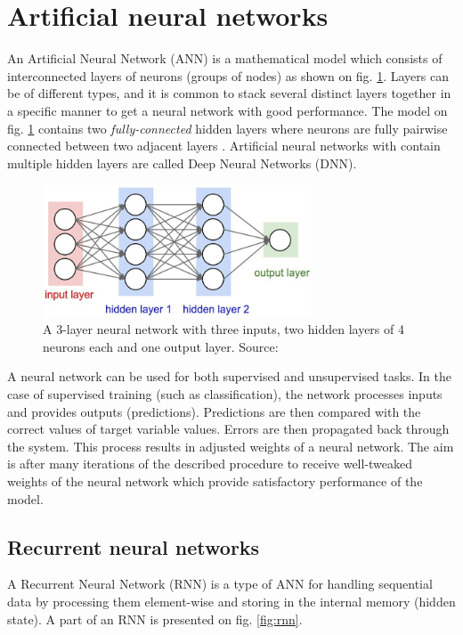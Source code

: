 \section{Artificial neural networks}
An Artificial Neural Network (ANN) is a mathematical model which consists of interconnected layers of neurons (groups of nodes) as shown on fig. \ref{fig:neural-net}. Layers can be of different types, and it is common to stack several distinct layers together in a specific manner to get a neural network with good performance. The model on fig. \ref{fig:neural-net} contains two \textit{fully-connected} hidden layers where neurons are fully pairwise connected between two adjacent layers \citep{FeiFei-2016}. Artificial neural networks with contain multiple hidden layers are called Deep Neural Networks (DNN). 

\begin{figure}[h]
    \centering
    \includegraphics[width=8cm]{Images/Neural-network.jpg}
    \caption{A 3-layer neural network with three inputs, two hidden layers of 4 neurons each and one output layer. Source: \citep{FeiFei-2016}}
    \label{fig:neural-net}
\end{figure} 

A neural network can be used for both supervised and unsupervised tasks. In the case of supervised training (such as classification), the network processes inputs and provides outputs (predictions). Predictions are then compared with the correct values of target variable values. Errors are then propagated back through the system. This process results in adjusted weights of a neural network. The aim is after many iterations of the described procedure to receive well-tweaked weights of the neural network which provide satisfactory performance of the model.

\subsection{Recurrent neural networks}
\label{sec:rnn}
A Recurrent Neural Network (RNN) is a type of ANN for handling sequential data by processing them element-wise and storing in the internal memory (hidden state). A part of an RNN is presented on fig. \ref{fig:rnn}.

